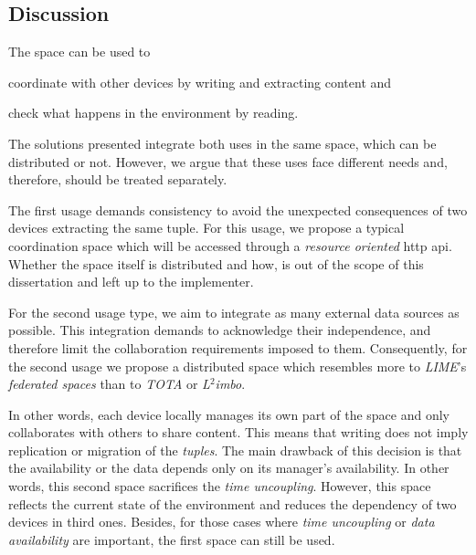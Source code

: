 \subsection{Discussion}

The space can be used to
\begin{enumerate*}[label=\itshape(\arabic*\upshape)]
  \item coordinate with other devices by writing and extracting content and
  \item check what happens in the environment by reading.
\end{enumerate*}
The solutions presented integrate both uses in the same space, which can be distributed or not.
However, we argue that these uses face different needs and, therefore, should be treated separately.


The first usage demands consistency to avoid the unexpected consequences of two devices extracting the same tuple.
For this usage, we propose a typical coordination space which will be accessed through a \emph{resource oriented} \ac{http} \ac{api}.
Whether the space itself is distributed and how, is out of the scope of this dissertation and left up to the implementer.


For the second usage type, we aim to integrate as many external data sources as possible.
This integration demands to acknowledge their independence, and therefore limit the collaboration requirements imposed to them.
Consequently, for the second usage we propose a distributed space which resembles more to \emph{LIME}'s \emph{federated spaces} than to \emph{TOTA} or \emph{L$^2$imbo}.


In other words, each device locally manages its own part of the space and only collaborates with others to share content.
This means that writing does not imply replication or migration of the \emph{tuples}.
The main drawback of this decision is that the availability or the data depends only on its manager's availability.
In other words, this second space sacrifices the \emph{time uncoupling}.
However, this space reflects the current state of the environment and reduces the dependency of two devices in third ones.
Besides, for those cases where \emph{time uncoupling} or \emph{data availability} are important, the first space can still be used.